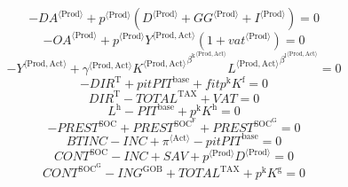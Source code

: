 \begin{equation}
-{{D\!A}}^{\langle \mathrm{Prod}\rangle} + {{p}^{\langle \mathrm{Prod}\rangle}} \left({D}^{\langle \mathrm{Prod}\rangle} + {{G\!G}}^{\langle \mathrm{Prod}\rangle} + {I}^{\langle \mathrm{Prod}\rangle}\right) = 0
\end{equation}
\begin{equation}
-{{O\!A}}^{\langle \mathrm{Prod}\rangle} + {{p}^{\langle \mathrm{Prod}\rangle}} {{Y}^{\langle \mathrm{Prod},\mathrm{Act}\rangle}} \left(1 + {{v\!a\!t}}^{\langle \mathrm{\mathrm{Prod}}\rangle}\right) = 0
\end{equation}
\begin{equation}
-{Y}^{\langle \mathrm{Prod},\mathrm{Act}\rangle} + {{\gamma}^{\langle \mathrm{\mathrm{Prod}},\mathrm{\mathrm{Act}}\rangle}} {{{K}^{\langle \mathrm{Prod},\mathrm{Act}\rangle}}^{{\beta^{\mathrm{k}}}^{\langle \mathrm{\mathrm{Prod}},\mathrm{\mathrm{Act}}\rangle}}} {{{L}^{\langle \mathrm{Prod},\mathrm{Act}\rangle}}^{{\beta^{\mathrm{l}}}^{\langle \mathrm{\mathrm{Prod}},\mathrm{\mathrm{Act}}\rangle}}} = 0
\end{equation}
\begin{equation}
-{D\!I\!R}^{\mathrm{T}} + {{p\!i\!t}} {{P\!I\!T}^{\mathrm{base}}} + {{f\!i\!t}} {p^{\mathrm{k}}} {K^{\mathrm{f}}} = 0
\end{equation}
\begin{equation}
{D\!I\!R}^{\mathrm{T}} - {T\!O\!T\!A\!L}^{\mathrm{TAX}} + {V\!A\!T} = 0
\end{equation}
\begin{equation}
L^{\mathrm{h}} - {P\!I\!T}^{\mathrm{base}} + {p^{\mathrm{k}}} {K^{\mathrm{h}}} = 0
\end{equation}
\begin{equation}
-{P\!R\!E\!S\!T}^{\mathrm{SOC}} + {P\!R\!E\!S\!T}^{\mathrm{SOC}^{\mathrm{F}}} + {P\!R\!E\!S\!T}^{\mathrm{SOC}^{\mathrm{G}}} = 0
\end{equation}
\begin{equation}
{B\!T\!I\!N\!C} - {I\!N\!C} + {\pi}^{\langle \mathrm{Act}\rangle} - {{p\!i\!t}} {{P\!I\!T}^{\mathrm{base}}} = 0
\end{equation}
\begin{equation}
{C\!O\!N\!T}^{\mathrm{SOC}} - {I\!N\!C} + {S\!A\!V} + {{p}^{\langle \mathrm{Prod}\rangle}} {{D}^{\langle \mathrm{Prod}\rangle}} = 0
\end{equation}
\begin{equation}
{C\!O\!N\!T}^{\mathrm{SOC}^{\mathrm{G}}} - {I\!N\!G}^{\mathrm{GOB}} + {T\!O\!T\!A\!L}^{\mathrm{TAX}} + {p^{\mathrm{k}}} {K^{\mathrm{g}}} = 0
\end{equation}
